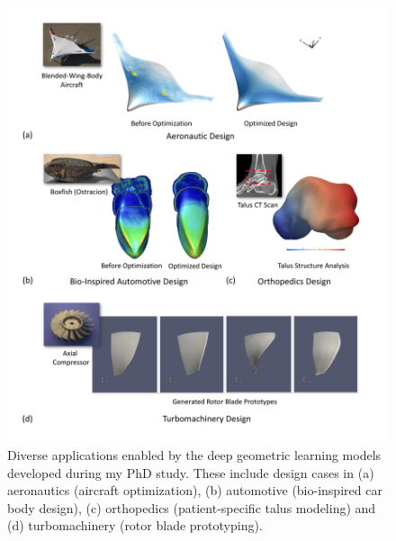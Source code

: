 \begin{figure}[!tbh]
    \begin{center}
        \includegraphics[width=1\linewidth]{chapter1/fig/teaser.pdf}
    \end{center}
    \vspace{-3mm}
    \caption{
        \small Diverse applications enabled by the deep geometric learning models developed during my PhD study. These include design cases in (a) aeronautics (aircraft optimization), (b) automotive (bio-inspired car body design), (c) orthopedics (patient-specific talus modeling) and (d) turbomachinery (rotor blade prototyping).
    }
    \label{ch1:fig:teaser}
\end{figure}


